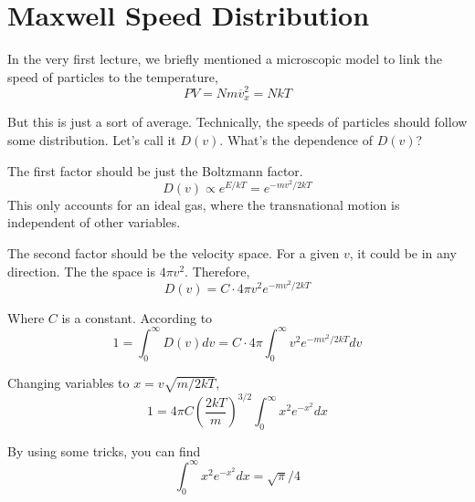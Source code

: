 
\section{Maxwell Speed Distribution}
In the very first lecture, we briefly mentioned a microscopic model to link the speed of particles to the temperature,
\begin{equation} \label{PV-micro} PV = Nm{\overline v_x^2} = NkT\end{equation}

But this is just a sort of average. Technically, the speeds of particles should follow some distribution.
Let's call it $D(v)$. What's the dependence of $D(v)$?

The first factor should be just the Boltzmann factor. 
\begin{equation}
D(v) \propto e^{E/kT} = e^{-mv^2/2kT}
\end{equation}
This only accounts for an ideal gas, where the transnational motion is independent of other variables.

The second factor should be the velocity space. For a given $v$, it could be in any direction. The the space is $4\pi v^2$.
Therefore,
\begin{equation}
D(v) = C \cdot 4\pi v^2 e^{-mv^2/2kT}
\end{equation}

Where $C$ is a constant. According to 
\begin{equation}
1 = \int _0 ^{\infty} D(v)dv  = C \cdot 4\pi \int_0^{\infty}v^2 e^{-mv^2/2kT} dv
\end{equation}

Changing variables to $x = v\sqrt{m/2kT}$,
\begin{equation}
1 =  4\pi C (\frac{2kT}{m})^{3/2}  \int _0 ^{\infty} x^2 e^{-x^2} dx
\end{equation}

By using some tricks, you can find
\begin{equation}
\int _0 ^{\infty} x^2 e^{-x^2} dx = \sqrt{\pi}/4
\end{equation}


